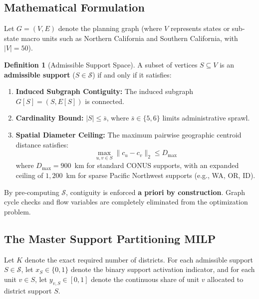 \documentclass[11pt,a4paper]{article}
\theoremstyle{plain}
\theoremstyle{definition}
\newtheorem{definition}{Definition}
\begin{document}
\subsection{Mathematical Formulation}
Let $G = (V, E)$ denote the planning graph (where $V$ represents states or sub-state macro units such as Northern California and Southern California, with $|V| = 50$). 

\begin{definition}[Admissible Support Space]\label{def:support}
A subset of vertices $S \subseteq V$ is an \textbf{admissible support} ($S \in \mathcal{S}$) if and only if it satisfies:
\begin{enumerate}[leftmargin=1.5em]
    \item \textbf{Induced Subgraph Contiguity:} The induced subgraph $G[S] = (S, E[S])$ is connected.
    \item \textbf{Cardinality Bound:} $|S| \le \bar{s}$, where $\bar{s} \in \{5, 6\}$ limits administrative sprawl.
    \item \textbf{Spatial Diameter Ceiling:} The maximum pairwise geographic centroid distance satisfies:
    \begin{equation}
        \max_{u, v \in S} \|c_u - c_v\|_2 \le D_{\max} \label{eq:diam}
    \end{equation}
    where $D_{\max} = 900$~km for standard CONUS supports, with an expanded ceiling of $1,200$~km for sparse Pacific Northwest supports (e.g., WA, OR, ID).
\end{enumerate}
\end{definition}

By pre-computing $\mathcal{S}$, contiguity is enforced \textbf{a priori by construction}. Graph cycle checks and flow variables are completely eliminated from the optimization problem.

\subsection{The Master Support Partitioning MILP}
Let $K$ denote the exact required number of districts. For each admissible support $S \in \mathcal{S}$, let $x_S \in \{0, 1\}$ denote the binary support activation indicator, and for each unit $v \in S$, let $y_{v, S} \in [0, 1]$ denote the continuous share of unit $v$ allocated to district support $S$.
\end{document}
